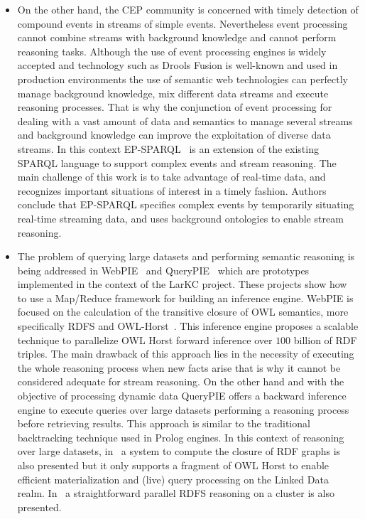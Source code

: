 \begin{itemize}
\item On the other hand, the CEP community is concerned with timely detection of 
compound events in streams of simple events. Nevertheless event processing 
cannot combine streams with background knowledge and cannot perform reasoning 
tasks. Although the use of event processing engines is widely accepted and 
technology such as Drools Fusion is well-known and used in production 
environments the use of semantic web technologies can perfectly manage 
background knowledge, mix different data streams and execute reasoning 
processes. That is why the conjunction of event processing for dealing with a 
vast amount of data and semantics to manage several streams and background 
knowledge can improve the exploitation of diverse data streams. In this context 
EP-SPARQL~\cite{Anicic:2011:EUL:1963405.1963495} is an extension of the existing SPARQL language to support complex 
events and stream reasoning. The main challenge of this work is to take 
advantage of real-time data, and recognizes important situations of interest in 
a timely fashion. Authors conclude that EP-SPARQL specifies complex events by 
temporarily situating real-time streaming data, and uses background ontologies 
to enable stream reasoning.

\item The problem of querying large datasets and performing semantic reasoning 
is being addressed in WebPIE~\cite{DBLP:journals/ws/UrbaniKMHB12} and QueryPIE~\cite{Urbani:2011:QBR:2063016.2063063} which are prototypes 
implemented in the context of the LarKC project. These projects show how to use 
a Map/Reduce framework for building an inference engine. WebPIE is focused on 
the calculation of the transitive closure of OWL semantics, more specifically 
RDFS and OWL-Horst~\cite{terHorst:2005:CDC:1741305.1741318}. This inference engine proposes a scalable technique to 
parallelize OWL Horst forward inference over $100$ billion of RDF triples. The 
main drawback of this approach lies in the necessity of executing the whole 
reasoning process when new facts arise that is why it cannot be considered 
adequate for stream reasoning. On the other hand and with the objective of 
processing dynamic data QueryPIE offers a backward inference engine to execute 
queries over large datasets performing a reasoning process before retrieving 
results. This approach is similar to the traditional backtracking technique used 
in Prolog engines. In this context of reasoning over large datasets, in~\cite{Hogan:2008:SAR:1484143.1484150,DBLP:journals/ijswis/HoganHP09,Umbrich:2012:IRL:2415113.2415129,Umbrich:2012:FUW:2413941.2413963} 
a system to compute the closure of RDF graphs is also presented but it 
only supports a fragment of OWL Horst to enable efficient materialization and 
(live) query processing on the Linked Data realm. In~\cite{Weaver:2009:PMF:1693684.1693728} a straightforward 
parallel RDFS reasoning on a cluster is also presented.


\end{itemize}
